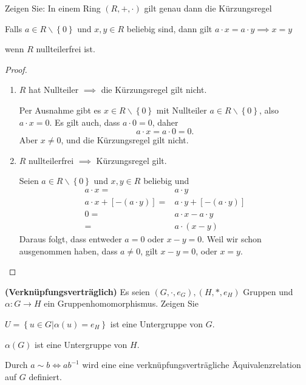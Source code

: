 \begin{Problem}
	Zeigen Sie: In einem Ring $(R,+,\cdot)$ gilt genau dann die Kürzungsregel
	\begin{tcolorbox}
		Falls $a\in R\backslash \left\{ 0 \right\} $ und $x,y\in R$ beliebig sind, dann gilt $a\cdot x = a \cdot y\implies x = y$
	\end{tcolorbox}
	wenn $R$ nullteilerfrei ist.
\end{Problem}
\begin{proof}
\begin{enumerate}
	\item $R$ hat Nullteiler $\implies$ die Kürzungsregel gilt nicht.

		Per Ausnahme gibt es $x\in R\backslash \left\{ 0 \right\} $ mit Nullteiler $a\in R\backslash \left\{ 0 \right\} $, also $a\cdot x=0$. Es gilt auch, dass $a\cdot 0=0$, daher
		\[
		a\cdot x = a\cdot 0 = 0
		.\] 
		Aber $x\neq 0$, und die Kürzungsregel gilt nicht.
	\item $R$ nullteilerfrei $\implies$ Kürzungsregel gilt.

		Seien $a\in R\backslash \left\{ 0 \right\} $ und $x,y\in R$ beliebig und
		\begin{align*}
			a\cdot x=&a\cdot y\\
			a\cdot x+[-(a\cdot y)]=&a\cdot y+[-(a\cdot y)]\\
			0=&a\cdot x - a \cdot y\\
			=&a\cdot (x-y)
	\end{align*}
	Daraus folgt, dass entweder $a=0$ oder $x-y=0$. Weil wir schon ausgenommen haben, dass $a\neq 0$, gilt $x-y=0$, oder $x=y$.\qedhere
\end{enumerate}
\end{proof}
\begin{Problem}
	\textbf{(Verknüpfungsverträglich)} Es seien $(G,\cdot, e_G), (H, *, e_H)$ Gruppen und $\alpha:G\to H$ ein Gruppenhomomorphismus. Zeigen Sie
	\begin{parts}
	\item $U=\left\{ u\in G|\alpha(u)=e_H \right\} $ ist eine Untergruppe von $G$.
	\item $\alpha(G)$ ist eine Untergruppe von $H$.
	\item Durch $a\sim b\iff ab^{-1}$ wird eine eine verknüpfungsverträgliche Äquivalenzrelation auf $G$ definiert.
	\end{parts}
\end{Problem}
